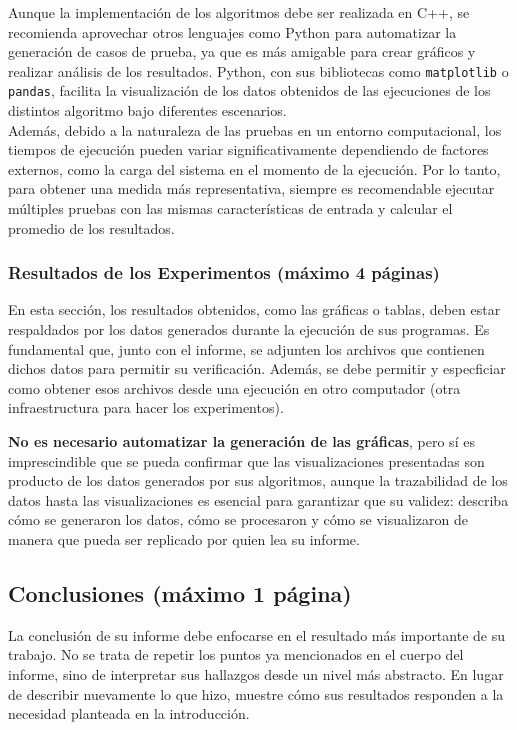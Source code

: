 \begin{mdframed}
    Aunque la implementación de los algoritmos debe ser realizada en C++, se recomienda aprovechar otros lenguajes como Python para automatizar la generación de casos de prueba, ya que es más amigable para crear gráficos y realizar análisis de los resultados. Python, con sus bibliotecas como \texttt{matplotlib} o \texttt{pandas}, facilita la visualización de los datos obtenidos de las ejecuciones de los distintos algoritmo bajo diferentes escenarios.\\
    
    Además, debido a la naturaleza de las pruebas en un entorno computacional, los tiempos de ejecución pueden variar significativamente dependiendo de factores externos, como la carga del sistema en el momento de la ejecución. Por lo tanto, para obtener una medida más representativa, siempre es recomendable ejecutar múltiples pruebas con las mismas características de entrada y calcular el promedio de los resultados.
\end{mdframed}


\subsubsection{Resultados de los Experimentos (máximo 4 páginas)}

En esta sección, los resultados obtenidos, como las gráficas o tablas, deben estar respaldados por los datos generados durante la ejecución de sus programas. Es fundamental que, junto con el informe, se adjunten los archivos que contienen dichos datos para permitir su verificación. Además, se debe permitir y especficiar como obtener esos archivos desde una ejecución en otro computador (otra infraestructura para hacer los experimentos).

\textbf{No es necesario automatizar la generación de las gráficas}, pero sí es imprescindible que se pueda confirmar que las visualizaciones presentadas son producto de los datos generados por sus algoritmos, aunque la trazabilidad de los datos hasta las visualizaciones es esencial para garantizar que su validez: describa cómo se generaron los datos, cómo se procesaron y cómo se visualizaron de manera que pueda ser replicado por quien lea su informe.


\subsection{Conclusiones (máximo 1 página)}

La conclusión de su informe debe enfocarse en el resultado más importante de su trabajo. No se trata de repetir los puntos ya mencionados en el cuerpo del informe, sino de interpretar sus hallazgos desde un nivel más abstracto. En lugar de describir nuevamente lo que hizo, muestre cómo sus resultados responden a la necesidad planteada en la introducción.
